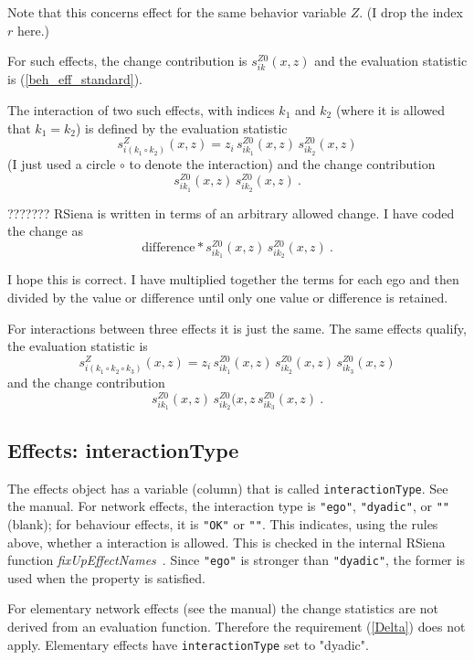 \documentclass[a4paper,12pt,fleqn]{article}
\newcommand{\nnm}[1]{\textsf{\small\textit{#1}\ }}
\begin{document}
Note that this concerns effect for the same behavior variable $Z$.
(I drop the index $r$ here.)

For such effects, the change contribution is $s_{ik}^{Z0}(x,z)$ and
the evaluation statistic is (\ref{beh_eff_standard}).


The interaction of two such effects, with indices $k_1$ and $k_2$
(where it is allowed that $k_1 = k_2$) is defined by the
evaluation statistic
\begin{equation}
  s_{i(k_1 \circ k_2)}^Z(x,z) = z_i\, s_{ik_1}^{Z0}(x,z) \, s_{ik_2}^{Z0}(x,z)  \label{beh_eff_int}
\end{equation}
(I just used a circle $\circ$ to denote the interaction)
and the change contribution
\[
   s_{ik_1}^{Z0}(x,z) \, s_{ik_2}^{Z0}(x,z)  \ .
\]

??????? RSiena is written in terms of an arbitrary allowed change. I have coded
the change as\[
  \textrm{difference}  * s_{ik_1}^{Z0}(x,z) \, s_{ik_2}^{Z0}(x,z)  \ .
\]

I hope this is correct. I have multiplied together the terms for each ego
and then divided by the value or difference until only one value or difference
is retained.



For interactions between three effects it is just the same.
The same effects qualify, the evaluation statistic is
\[
  s_{i(k_1 \circ k_2 \circ k_3)}^Z(x,z) = z_i\, s_{ik_1}^{Z0}(x,z) \, s_{ik_2}^{Z0}(x,z)\, s_{ik_3}^{Z0}(x,z)
\]
and the change contribution
\[
   s_{ik_1}^{Z0}(x,z) \, s_{ik_2}^{Z0}(x,z\, s_{ik_3}^{Z0}(x,z)  \ .
\]



\subsection{Effects: interactionType}

The effects object has a variable (column) that is called
\texttt{interactionType}.
See the manual.
For network effects, the interaction type is \texttt{"ego"},
\texttt{"dyadic"}, or \texttt{""} (blank);
for behaviour effects, it is \texttt{"OK"} or \texttt{""}.
This indicates, using the rules above, whether a interaction
is allowed. This is checked in the internal RSiena function
\nnm{fixUpEffectNames}. Since \texttt{"ego"} is stronger
than \texttt{"dyadic"}, the former is used when the property is satisfied.

For elementary network effects (see the manual)
the change statistics are not derived
from an evaluation function. Therefore the requirement
(\ref{Delta}) does not apply.  Elementary effects have
\texttt{interactionType} set to "dyadic".
\end{document}
